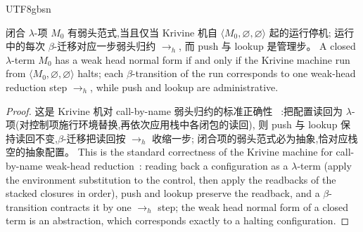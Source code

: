 \begin{CJK*}{UTF8}{gbsn}
\begin{proposition}\label{prop:krivine-whnf}
  \ifPaperChinese
  闭合 $\lambda$-项 $M_0$ 有弱头范式,当且仅当 Krivine 机自
  $\langle M_0, \varnothing, \varnothing \rangle$ 起的运行停机;
  运行中的每次 $\beta$-迁移对应一步弱头归约 $\to_h$,
  而 push 与 lookup 是管理步。
  \else
  A closed $\lambda$-term $M_0$ has a weak head normal form if and
  only if the Krivine machine run from
  $\langle M_0, \varnothing, \varnothing \rangle$ halts; each
  $\beta$-transition of the run corresponds to one weak-head reduction
  step $\to_h$, while push and lookup are administrative.
  \fi
\end{proposition}

\begin{proof}
\ifPaperChinese
  这是 Krivine 机对 call-by-name 弱头归约的标准正确性
  ~\cite{krivine2007-callbyname-machine}:把配置读回为
  $\lambda$-项(对控制项施行环境替换,再依次应用栈中各闭包的读回),
  则 push 与 lookup 保持读回不变,$\beta$-迁移把读回按 $\to_h$ 收缩一步;
  闭合项的弱头范式必为抽象,恰对应栈空的抽象配置。
\else
  This is the standard correctness of the Krivine machine for
  call-by-name weak-head
  reduction~\cite{krivine2007-callbyname-machine}: reading back a
  configuration as a $\lambda$-term (apply the environment
  substitution to the control, then apply the readbacks of the stacked
  closures in order), push and lookup preserve the readback, and a
  $\beta$-transition contracts it by one $\to_h$ step; the weak head
  normal form of a closed term is an abstraction, which corresponds
  exactly to a halting configuration.
\fi
\end{proof}

\subsection{}


\end{CJK*}
